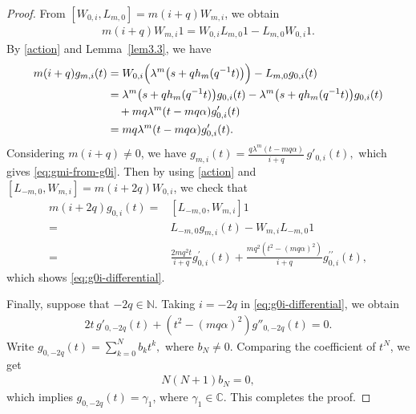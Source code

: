 \documentclass[a4paper]{amsart}
\numberwithin{equation}{section}
\begin{document}
\begin{proof}
From 
$[W_{0,i},L_{m,0}]=m(i+q)W_{m,i}$, we obtain
\begin{align*}
m(i+q)W_{m,i}1
=
W_{0,i}L_{m,0}1-L_{m,0}W_{0,i}1.
\end{align*}
By \eqref{action} and Lemma~\ref{lem3.3}, we have
\begin{align*}
m(i+q)g_{m,i}(t)
&=
W_{0,i}\Bigl(\lambda^m\bigl(s+qh_m(q^{-1}t)\bigr)\Bigr)
-
L_{m,0}g_{0,i}(t)\\
&=
\lambda^m\bigl(s+qh_m(q^{-1}t)\bigr)g_{0,i}(t)
-
\lambda^m\bigl(s+qh_m(q^{-1}t)\bigr)g_{0,i}(t)\\
&\quad
+
mq\lambda^m(t-mq\alpha)g'_{0,i}(t)\\
&=
mq\lambda^m(t-mq\alpha)g'_{0,i}(t).
\end{align*}
Considering $m(i+q)\neq0$, we have
$
g_{m,i}(t)
=
\frac{q\lambda^m  (t-mq\alpha)}{i+q}\,g'_{0,i}(t),
$
which gives \eqref{eq:gmi-from-g0i}.
Then by using 
\eqref{action}  and 
$[L_{-m,0},W_{m,i}]=m(i+2q)W_{0,i}$, we check that 
 \begin{align*}
     m(i+2q)g_{0,i}(t)=&[L_{-m,0},W_{m,i}] 1\\
     =&L_{-m,0} g_{m,i}(t)-W_{m,i} L_{-m,0} 1\\
     =&\frac{2mq^2t}{i+q}g^\prime_{0,i}(t)+\frac{mq^2(t^2-(mq\alpha)^2)}{i+q}g^{\prime\prime}_{0,i}(t),
 \end{align*}
 which shows 
 \eqref{eq:g0i-differential}.

Finally, suppose that $-2q\in\mathbb N$. Taking $i=-2q$ in
\eqref{eq:g0i-differential}, we obtain
\begin{align*}
2t\,g'_{0,-2q}(t)
+
(t^2-(mq\alpha)^2)g''_{0,-2q}(t)=0.
\end{align*}
Write
$
g_{0,-2q}(t)=\sum_{k=0}^{N}b_kt^k,$ where $ b_N\neq0.
$
Comparing the coefficient of $t^N$, we get
\begin{align*}
N(N+1)b_N=0,
\end{align*}
which implies $g_{0,-2q}(t)=\gamma_{1}$, where $\gamma_{1}\in\mathbb{C}$. 
This completes the proof.
\end{proof}
\end{document}
